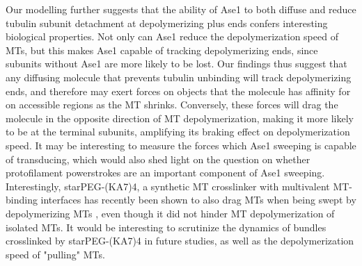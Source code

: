 Our modelling further suggests that the ability of Ase1 to both diffuse and reduce tubulin subunit detachment at depolymerizing plus ends confers interesting biological properties. Not only can Ase1 reduce the depolymerization speed of MTs, but this makes Ase1 capable of tracking depolymerizing ends, since subunits without Ase1 are more likely to be lost. Our findings thus suggest that any diffusing molecule that prevents tubulin unbinding will track depolymerizing ends, and therefore may exert forces on objects that the molecule has affinity for on accessible regions as the MT shrinks. Conversely, these forces will drag the molecule in the opposite direction of MT depolymerization, making it more likely to be at the terminal subunits, amplifying its braking effect on depolymerization speed. It may be interesting to measure the forces which Ase1 sweeping is capable of transducing, which would also shed light on the question on whether protofilament powerstrokes are an important component of Ase1 sweeping. Interestingly, starPEG-(KA7)4, a synthetic MT crosslinker with multivalent MT-binding interfaces has recently been shown to also drag MTs when being swept by depolymerizing MTs \parencite{Drechsler2019}, even though it did not hinder MT depolymerization of isolated MTs. It would be interesting to scrutinize the dynamics of bundles crosslinked by starPEG-(KA7)4 in future studies, as well as the depolymerization speed of "pulling" MTs. 

